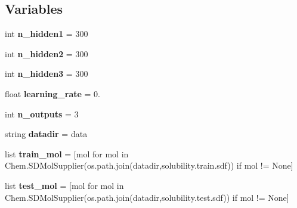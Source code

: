 \subsection*{Variables}
\begin{DoxyCompactItemize}
\item 
\mbox{\label{namespacechemistry2quant_1_1chem2quant__NN_ad12d111be251ed83af451082bd45a2dc}} 
int {\bfseries n\+\_\+hidden1} = 300
\item 
\mbox{\label{namespacechemistry2quant_1_1chem2quant__NN_aa40ec150e2ce46aff8986fd5e4124ae8}} 
int {\bfseries n\+\_\+hidden2} = 300
\item 
\mbox{\label{namespacechemistry2quant_1_1chem2quant__NN_a2b7163491dd3dbe22fa62ac0b86a466e}} 
int {\bfseries n\+\_\+hidden3} = 300
\item 
\mbox{\label{namespacechemistry2quant_1_1chem2quant__NN_a018c556b422445320a2240a054ba7dc7}} 
float {\bfseries learning\+\_\+rate} = 0.
\item 
\mbox{\label{namespacechemistry2quant_1_1chem2quant__NN_ab66d41ca20104dd9e8662d8cfa52bf1f}} 
int {\bfseries n\+\_\+outputs} = 3
\item 
\mbox{\label{namespacechemistry2quant_1_1chem2quant__NN_afe2d119cffc5840ca31b1df221352f44}} 
string {\bfseries datadir} = \textquotesingle{}data\textquotesingle{}
\item 
\mbox{\label{namespacechemistry2quant_1_1chem2quant__NN_aaab99f2dc8ab9cd9758c58dcf76974e5}} 
list {\bfseries train\+\_\+mol} = \mbox{[}mol for mol in Chem.\+S\+D\+Mol\+Supplier(os.\+path.\+join(datadir,\textquotesingle{}solubility.\+train.\+sdf\textquotesingle{})) if mol != None\mbox{]}
\item 
\mbox{\label{namespacechemistry2quant_1_1chem2quant__NN_aa676e75d1cc9fd816d42a6e109716171}} 
list {\bfseries test\+\_\+mol} = \mbox{[}mol for mol in Chem.\+S\+D\+Mol\+Supplier(os.\+path.\+join(datadir,\textquotesingle{}solubility.\+test.\+sdf\textquotesingle{})) if mol != None\mbox{]}

\end{DoxyCompactItemize}

